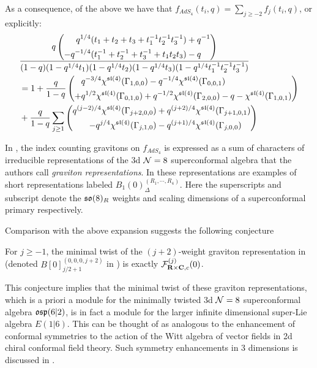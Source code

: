 \documentclass[../main.tex]{subfiles}
\begin{document}
\parsec[]
As a consequence, of the above we have that $f_{AdS_4} (t_i, q) = \sum_{j\geq -2} f_j (t_i, q)$, or explicitly:
\begin{align*}
& \frac{q\left (\begin{aligned} q^{1/4}(t_1+ t_2 + t_3+t_1^{-1}t_2^{-1}t_3^{-1}) &+ q^{-1} \\- q^{-1/4}(t_1^{-1}+ t_2^{-1} + t_3^{-1}+t_1t_2t_3) &- q   \end{aligned}\right)}{(1-q)(1-q^{1/4}t_1)(1-q^{1/4}t_2)(1-q^{1/4}t_3)(1-q^{1/4}t_1^{-1}t_2^{-1}t_3^{-1})}  \\ 
& =  1 + \frac{q}{1-q} \left (\begin{aligned} & q^{-3/4}\chi^{\mathfrak{sl}(4)}(\Gamma_{1,0,0}) - q^{-1/4}\chi^{\mathfrak{sl}(4)}(\Gamma_{0,0,1}) \\+ & q^{1/2}\chi^{\mathfrak{sl}(4)}(\Gamma_{0,1,0})  + q^{-1/2}\chi^{\mathfrak{sl}(4)}(\Gamma_{2,0,0})  - q - \chi^{\mathfrak{sl}(4)}(\Gamma_{1,0,1}) \end{aligned}\right ) \\
& + \frac{q}{1-q} \sum_{j\geq 1} \left (\begin{aligned} q^{(j-2)/4}\chi^{\mathfrak{sl}(4)}(\Gamma_{j+2,0,0})  &+ q^{(j+2)/4}\chi^{\mathfrak{sl}(4)}(\Gamma_{j+1,0,1}) \\ - q^{j/4}\chi^{\mathfrak{sl}(4)}(\Gamma_{j,1,0}) & - q^{(j+1)/4}\chi^{\mathfrak{sl}(4)}(\Gamma_{j,0,0}) \end{aligned}\right ) 
\end{align*}

In \cite[Eq. (2.15, 2.16)]{Bhattacharya:2008zy}, the index counting gravitons on $f_{AdS_4}$ is expressed as a sum of characters of irreducible representations of the 3d $\mathcal{N} = 8$ superconformal algebra that the authors call \textit{graviton representations}. In \cite[Table 9]{cordova2016multiplets} these representations are examples of short representations labeled $B_1(0)_{\Delta}^{(R_1,\cdots, R_4)}$. Here the superscripts and subscript denote the $\mathfrak{so}(8)_R$ weights and scaling dimensions of a superconformal primary respectively. 

Comparison with the above expansion suggests the following conjecture

\begin{conj}\label{conj:e16gravitonrep}
For $j\geq -1$, the minimal twist of the $(j+2)$-weight graviton representation in \cite[Eq. (2.15, 2.16)]{Bhattacharya:2008zy} (denoted $B[0]_{j/2+1}^{(0,0,0,j+2)}$ in \cite{cordova2016multiplets}) is exactly $\mathcal{F}^{(j)}_{\mathbf{R}\times \mathbf{C}, c}(0)$. 
\end{conj}

\begin{rmk}\label{rmk:e16enhance}
This conjecture implies that the minimal twist of these graviton representations, which is a priori a module for the minimally twisted 3d $\mathcal{N}=8$ superconformal algebra $\mathfrak{osp}(6|2)$, is in fact a module for the larger infinite dimensional super-Lie algebra $E(1|6)$. This can be thought of as analogous to the enhancement of conformal symmetries to the action of the Witt algebra of vector fields in 2d chiral conformal field theory. Such symmetry enhancements in 3 dimensions is discussed in \cite{GRW}.
\end{rmk}
\end{document}
